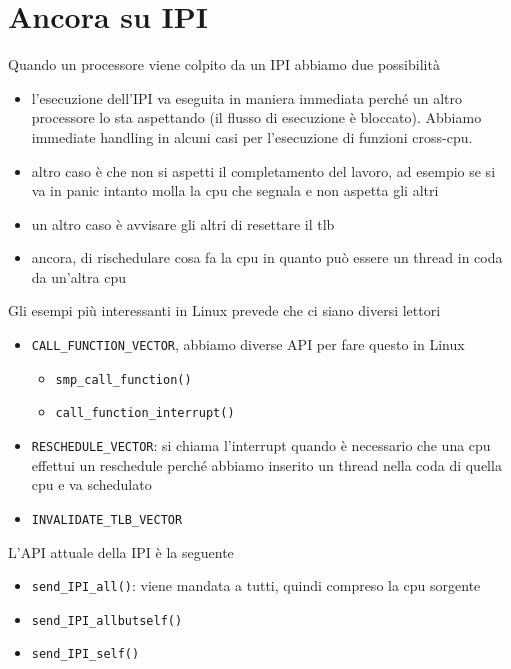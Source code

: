\documentclass[12pt, oneside]{extbook}
\begin{document}
\section{Ancora su IPI}
Quando un processore viene colpito da un IPI abbiamo due possibilità
\begin{itemize}
\item l'esecuzione dell'IPI va eseguita in maniera immediata perché un altro processore lo sta aspettando (il flusso di esecuzione è bloccato). Abbiamo immediate handling in alcuni casi per l'esecuzione di funzioni cross-cpu.
\item altro caso è che non si aspetti il completamento del lavoro, ad esempio se si va in panic intanto molla la cpu che segnala e non aspetta gli altri
\item un altro caso è avvisare gli altri di resettare il tlb
\item ancora, di rischedulare cosa fa la cpu in quanto può essere un thread in coda da un'altra cpu
\end{itemize}
Gli esempi più interessanti in Linux prevede che ci siano diversi lettori
\begin{itemize}
\item \texttt{CALL\_FUNCTION\_VECTOR}, abbiamo diverse API per fare questo in Linux
\begin{itemize}
\item \texttt{smp\_call\_function()}
\item \texttt{call\_function\_interrupt()}
\end{itemize}
\item \texttt{RESCHEDULE\_VECTOR}: si chiama l'interrupt quando è necessario che una cpu effettui un reschedule perché abbiamo inserito un thread nella coda di quella cpu e va schedulato
\item \texttt{INVALIDATE\_TLB\_VECTOR}
\end{itemize}
L'API attuale della IPI è la seguente
\begin{itemize}
\item \texttt{send\_IPI\_all()}: viene mandata a tutti, quindi compreso la cpu sorgente
\item \texttt{send\_IPI\_allbutself()}
\item \texttt{send\_IPI\_self()}
\end{itemize}
\end{document}
